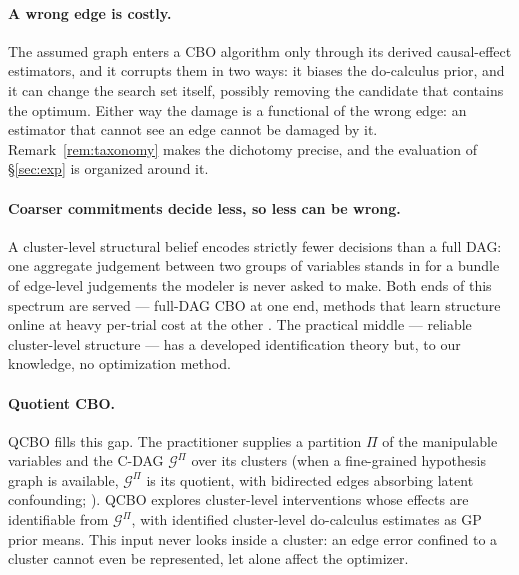 \documentclass[twoside]{article}
\newcommand{\QCBO}{\textsc{QCBO}}
\newcommand{\CBO}{\textsc{CBO}}
\newcommand{\Gq}{\mathcal{G}^{\Pi}}
\begin{document}
\paragraph{A wrong edge is costly.}
The assumed graph enters a \CBO{} algorithm only through its derived causal-effect estimators, and it corrupts them in two ways: it biases the do-calculus prior, and it can change the search set itself, possibly removing the candidate that contains the optimum. Either way the damage is a functional of the wrong edge: an estimator that cannot see an edge cannot be damaged by it. Remark~\ref{rem:taxonomy} makes the dichotomy precise, and the evaluation of \S\ref{sec:exp} is organized around it.

\paragraph{Coarser commitments decide less, so less can be wrong.}
A cluster-level structural belief encodes strictly fewer decisions than a
full DAG: one aggregate judgement between two groups of variables stands in
for a bundle of edge-level judgements the modeler is never asked to make.
Both ends of this spectrum are served --- full-DAG \CBO{} at one end, methods
that learn structure online at heavy per-trial cost at the other
\citep{mukherjee2024gacbo,branchini2023ceo}. The practical middle ---
reliable cluster-level structure --- has a developed identification theory
\citep{anand2023cdag,ferreira2025cdmg,wahl2024foundations} but, to our
knowledge, no optimization method.

\paragraph{Quotient \CBO{}.} \QCBO{} fills this gap. The practitioner supplies a partition $\Pi$ of the manipulable variables and the C-DAG $\Gq$ over its clusters (when a fine-grained hypothesis graph is available, $\Gq$ is its quotient, with bidirected edges absorbing latent confounding; \citealp{lee2019latent}). \QCBO{} explores cluster-level interventions whose effects are identifiable from $\Gq$, with identified cluster-level do-calculus estimates as GP prior means. This input never looks inside a cluster: an edge error confined to a cluster cannot even be represented, let alone affect the optimizer.
\end{document}
